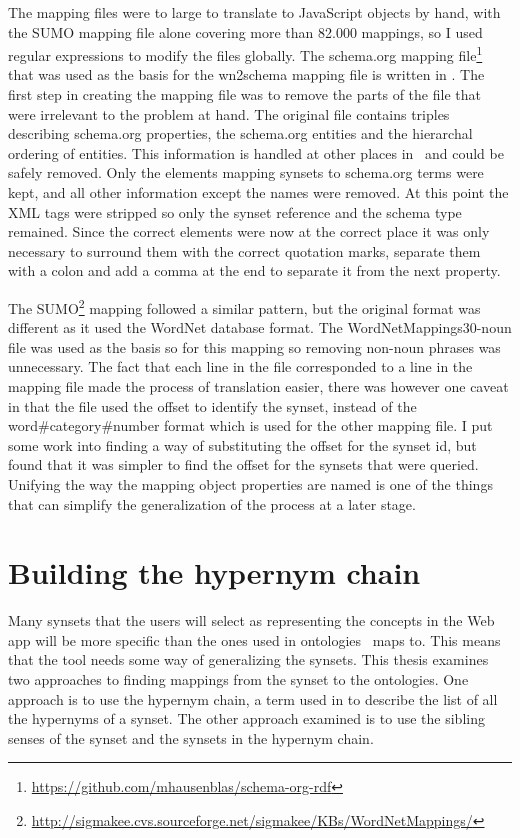 The mapping files were to large to translate to JavaScript objects by hand, with the SUMO mapping file alone
covering more than 82.000 mappings, so I used regular expressions to modify the files globally.
The schema.org mapping file\footnote{\url{https://github.com/mhausenblas/schema-org-rdf}}
that was used as the basis for the wn2schema mapping file is written in .
The first step in creating the mapping file was to remove the parts of the file that were irrelevant to the problem at hand.
The original file contains triples describing schema.org properties,
the schema.org entities and the hierarchal ordering of entities.
This information is handled at other places in \theartefact\ and could be safely removed.
Only the elements mapping synsets to schema.org terms were kept, and all other information except the names were removed.
At this point the XML tags were stripped so only the synset reference and the schema type remained.
Since the correct elements were now at the correct place it was only necessary to surround them with the correct quotation
marks, separate them with a colon and add a comma at the end to separate it from the next property.

The SUMO\footnote{\url{http://sigmakee.cvs.sourceforge.net/sigmakee/KBs/WordNetMappings/}} mapping followed a similar pattern,
but the original format was different as it used the WordNet database format.
The WordNetMappings30-noun file was used as the basis so for this mapping so removing non-noun phrases was unnecessary.
The fact that each line in the file corresponded to a line in the mapping file made the process of translation easier,
there was however one caveat in that the file used the offset to identify the synset,
instead of the word\#category\#number format which is used for the other mapping file.
I put some work into finding a way of substituting the offset for the synset id,
but found that it was simpler to find the offset for the synsets that were queried.
Unifying the way the mapping object properties are named is one of the things that can simplify
the generalization of the process at a later stage.



\section{Building the hypernym chain}
\label{BuildingTheHypernymChain}
Many synsets that the users will select as representing the concepts in the Web app will be more specific than
the ones used in ontologies \theartefact\ maps to.
This means that the tool needs some way of generalizing the synsets.
This thesis examines two approaches to finding mappings from the synset to the ontologies.
One approach is to use the hypernym chain,
a term used in \citet{Veres2011} to describe the list of all the hypernyms of a synset.
The other approach examined is to use the sibling senses of the synset and the synsets in the hypernym chain.

